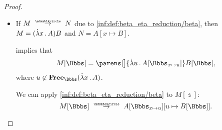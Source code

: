 \begin{proof}
\begin{itemize}
    By assumption, \( u \) is not in \( \op*{Free}_\Bbbs(M) \), hence it belongs to \( \op*{Free}_\Bbbs(A) \) only if it is free in \( \Bbbs(x) \). The generalized condition in  is satisfied, so we conclude that
    \begin{equation*}
      A[\Bbbs_{x \mapsto u}][u \mapsto v] \aequiv A[\Bbbs_{x \mapsto v}].
    \end{equation*}

    Therefore,
    \begin{equation}\label{eq:thm:substitution_on_single_step_reduction/proof/abs/alpha}
      M[\Bbbs] \aequiv \qabs v A[\Bbbs_{x \mapsto v}].
    \end{equation}

    The inductive hypothesis implies that
    \begin{equation*}
      A[\Bbbs_{x \mapsto v}] \pred B[\Bbbs_{x \mapsto v}],
    \end{equation*}
    hence, we can apply \ref{inf:def:lambda_term_reduction/abs} to conclude that
    \begin{equation}\label{eq:thm:substitution_on_single_step_reduction/proof/abs/hyp}
      \qabs v A[\Bbbs_{x \mapsto v}] \pred \qabs v B[\Bbbs_{x \mapsto v}].
    \end{equation}

    Finally, by noting \eqref{eq:thm:substitution_on_single_step_reduction/proof/abs/alpha}, we can apply \ref{inf:def:lambda_term_reduction/alpha} to conclude that
    \begin{equation*}
      M[\Bbbs]
      =
      \qabs u A[\Bbbs_{x \mapsto u}]
      \pred
      \qabs v B[\Bbbs_{x \mapsto v}]
      =
      N[\Bbbs].
    \end{equation*}

    \item If \( M \pred N \) due to \ref{inf:def:beta_eta_reduction/beta}, then \( M = (\qabs x A)B \) and \( N = A[x \mapsto B] \).

     implies that
    \begin{equation*}
      M[\Bbbs] = \parens[\big]{ \qabs u A[\Bbbs_{x \mapsto u}] } B[\Bbbs],
    \end{equation*}
    where \( u \not\in \op*{Free}_\Bbbs(\qabs x A) \).

    We can apply \ref{inf:def:beta_eta_reduction/beta} to \( M[\Bbbs] \):
    \begin{equation*}
      M[\Bbbs]
      \pred
      A[\Bbbs_{x \mapsto u}][u \mapsto B[\Bbbs]].
    \end{equation*}


\end{itemize}
\end{proof}
